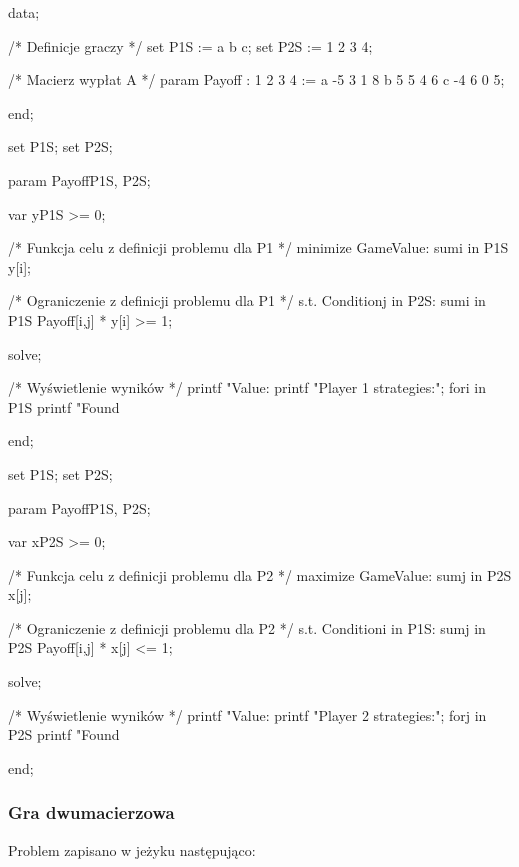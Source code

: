 \documentclass[polish]{standalone}
\begin{document}
\begin{code}[caption=Przykładowe dane]
data;

/* Definicje graczy */
set P1S := a b c;
set P2S := 1 2 3 4;

/* Macierz wypłat A */
param Payoff
    :  1  2  3  4 :=
    a -5  3  1  8
    b  5  5  4  6
    c -4  6  0  5;
 
end;
\end{code}

\begin{code}[caption=Rozwiązanie dla gracza pierwszego]
set P1S;
set P2S;

param Payoff{P1S, P2S};

var y{P1S} >= 0;

/* Funkcja celu z definicji problemu dla P1 */
minimize GameValue: sum{i in P1S} y[i];

/* Ograniczenie z definicji problemu dla P1 */
s.t. Condition{j in P2S}:
    sum{i in P1S} Payoff[i,j] * y[i] >= 1;

solve;

/* Wyświetlenie wyników */
printf "Value: %
printf "Player 1 strategies:\n";
for{i in P1S}
    printf "Found %

end;
\end{code}

\begin{code}[caption=Rozwiązanie dla gracza drugiego]
set P1S;
set P2S;

param Payoff{P1S, P2S};

var x{P2S} >= 0;

/* Funkcja celu z definicji problemu dla P2 */
maximize GameValue: sum{j in P2S} x[j];

/* Ograniczenie z definicji problemu dla P2 */
s.t. Condition{i in P1S}:
    sum{j in P2S} Payoff[i,j] * x[j] <= 1;

solve;

/* Wyświetlenie wyników */
printf "Value: %
printf "Player 2 strategies:\n";
for{j in P2S}
    printf "Found %
 
end;
\end{code}

\subsubsection{Gra dwumacierzowa}

Problem zapisano w jeżyku  następująco:
\end{document}
